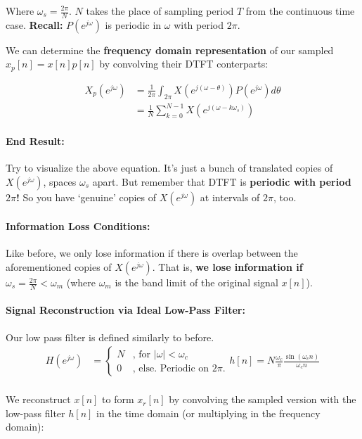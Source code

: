\documentclass[a4paper,12pt]{report}
\begin{document}
Where $\omega_s = \frac{2\pi}{N}$. $N$ takes the place of sampling period $T$ from the continuous time case. \textbf{Recall:} $P(e^{j\omega})$ is periodic in $\omega$ with period $2\pi$.

We can determine the \textbf{frequency domain representation} of our sampled $x_p[n] = x[n]p[n]$ by convolving their DTFT conterparts: 

\begin{align}
X_p(e^{j\omega}) &= \frac{1}{2\pi} \int_{2\pi}^{} X(e^{j(\omega-\theta)})P(e^{j\omega})d\theta \\
&= \frac{1}{N} \sum_{k=0}^{N-1} X(e^{j(\omega-k\omega_s)}) 
\end{align}

\paragraph{End Result: } Try to visualize the above equation. It's just a bunch of translated copies of $X(e^{j\omega})$, spaces $\omega_s$ apart. But remember that DTFT is \textbf{periodic with period $2\pi$!} So you have `genuine' copies of $X(e^{j\omega} )$ at intervals of $2\pi$, too.

\paragraph{Information Loss Conditions: } Like before, we only lose information if there is overlap between the aforementioned copies of $X(e^{j\omega})$. That is, \textbf{we lose information if $\omega_s = \frac{2\pi}{N} < \omega_m$} (where $\omega_m$ is the band limit of the original signal $x[n]$).

\paragraph{Signal Reconstruction via Ideal Low-Pass Filter: } Our low pass filter is defined similarly to before.
\begin{align}
H(e^{j\omega}) &= \begin{cases}
N & \text{, for } |\omega| < \omega_c \\
0 & \text{, else. Periodic on } 2\pi.
\end{cases}
h[n] = N\frac{\omega_c}{\pi} \frac{\sin(\omega_c n)}{\omega_c n} \\
\end{align}

We reconstruct $x[n]$ to form $x_r[n]$ by convolving the sampled version with the low-pass filter $h[n]$ in the time domain (or multiplying in the frequency domain):
\end{document}
